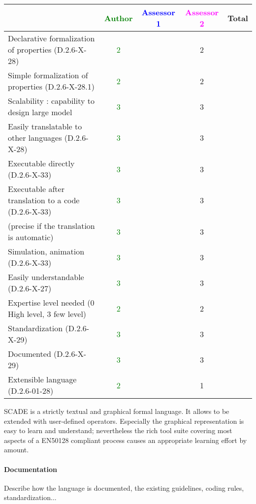 \begin{tabular}{|l | c | c | c | c|}
\hline
& \textcolor{green}{Author} & \textcolor{blue}{Assessor 1} & \textcolor{magenta}{Assessor 2} & Total \\
\hline
Declarative formalization of properties (D.2.6-X-28) & \textcolor{green}{2}  & &2 & \\
\hline
Simple formalization of properties (D.2.6-X-28.1) & \textcolor{green}{2} & &2 & \\
\hline
Scalability : capability to design large model &  \textcolor{green}{3}  & &3 & \\
\hline
Easily translatable to other languages (D.2.6-X-28) &  \textcolor{green}{3}  & &3 & \\
\hline
Executable directly (D.2.6-X-33) & \textcolor{green}{3}  & &3 & \\
\hline
Executable after translation to a code (D.2.6-X-33) &  \textcolor{green}{3}& &3 & \\
(precise if the translation is automatic) &  \textcolor{green}{3}& &3 & \\
\hline
Simulation, animation (D.2.6-X-33) &  \textcolor{green}{3} & &3 & \\
\hline
Easily understandable (D.2.6-X-27) &  \textcolor{green}{3}& &3 & \\
\hline
Expertise level needed (0 High level, 3 few level) &  \textcolor{green}{2} & &2 & \\
\hline
Standardization (D.2.6-X-29) &  \textcolor{green}{3}& &3 & \\
\hline
Documented (D.2.6-X-29) &  \textcolor{green}{3} & &3 & \\
\hline
Extensible language (D.2.6-01-28) &  \textcolor{green}{2}& &1 & \\
\hline
\end{tabular}
\begin{author_comment}
SCADE is a strictly textual and graphical formal language. It allows to be extended with user-defined operators. Especially the graphical representation is easy to learn and understand; nevertheless the rich tool suite covering most aspects of a EN50128 compliant process causes an appropriate learning effort by amount.
\end{author_comment}


\paragraph{Documentation} Describe how the language is documented, the existing guidelines, coding rules, standardization...

